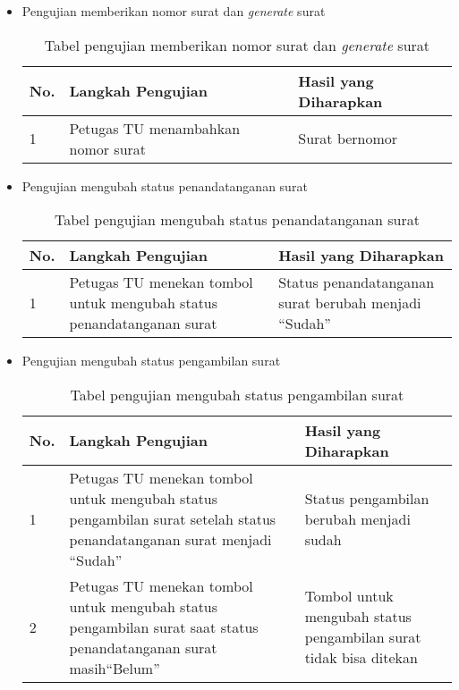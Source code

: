 \begin{itemize}
	\item Pengujian memberikan nomor surat dan \textit{generate} surat
	\begin{table}[H]
	\centering
	\caption{Tabel pengujian memberikan nomor surat dan \textit{generate} surat}
	\label{pengujian_memberikan_nomor_surat_dan_generate_surat}
	\begin{tabular}{|l|p{6cm}|p{6cm}|}
	\hline
	\textbf{No.}&\textbf{Langkah Pengujian}&\textbf{Hasil yang Diharapkan}\\ \hline
	1&Petugas TU menambahkan nomor surat&Surat bernomor\\ \hline
	\end{tabular}
	\end{table}
	
	\item Pengujian mengubah status penandatanganan surat
	\begin{table}[H]
	\centering
	\caption{Tabel pengujian mengubah status penandatanganan surat}
	\label{pengujian_mengubah_status_penandatanganan_surat}
	\begin{tabular}{|l|p{6cm}|p{6cm}|}
	\hline
	\textbf{No.}&\textbf{Langkah Pengujian}&\textbf{Hasil yang Diharapkan}\\ \hline
	1&Petugas TU menekan tombol untuk mengubah status penandatanganan surat&Status penandatanganan surat berubah menjadi "`Sudah"' \\ \hline
	\end{tabular}
	\end{table}
	
	\item Pengujian mengubah status pengambilan surat
	\begin{table}[H]
	\centering
	\caption{Tabel pengujian mengubah status pengambilan surat}
	\label{pengujian_mengubah_status_pengambilan_surat}
	\begin{tabular}{|l|p{6cm}|p{6cm}|}
	\hline
	\textbf{No.}&\textbf{Langkah Pengujian}&\textbf{Hasil yang Diharapkan}\\ \hline
	1&Petugas TU menekan tombol untuk mengubah status pengambilan surat setelah status penandatanganan surat menjadi "`Sudah"'&Status pengambilan berubah menjadi sudah \\ \hline
	2&Petugas TU menekan tombol untuk mengubah status pengambilan surat saat status penandatanganan surat masih"`Belum"'&Tombol untuk mengubah status pengambilan surat tidak bisa ditekan\\ \hline
	\end{tabular}
	\end{table} 
	

\end{itemize}
